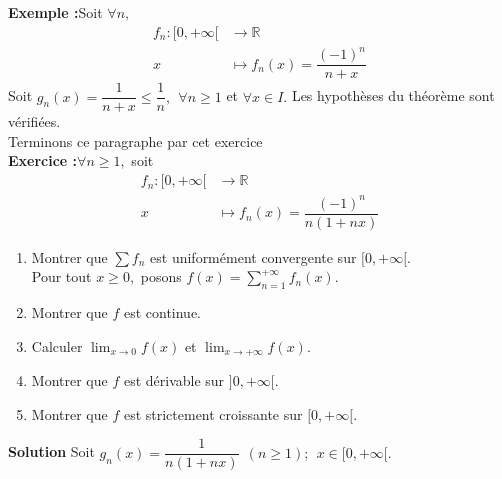 \documentclass[11pt, a4paper]{book}
\begin{document}
\textbf{Exemple :}\quad Soit $\forall n,$ 
\begin{align*}
f_n:[0,+\infty[&\longrightarrow\mathbb{R}\\
x&\longmapsto f_n(x)=\dfrac{(-1)^n}{n+x}
\end{align*}
Soit $g_n(x)=\dfrac{1}{n+x}\leq\dfrac{1}{n},~~\forall n\geq1$ et $\forall x\in I.$ Les hypoth\`eses du th\'eor\`eme sont v\'erifi\'ees.\\
Terminons ce paragraphe par cet exercice\\
\textbf{Exercice :}\quad $\forall n\geq 1,$ soit 
\begin{align*}
f_n:[0,+\infty[&\longrightarrow\mathbb{R}\\
x&\longmapsto f_n(x)=\dfrac{(-1)^n}{n(1+nx)}
\end{align*}
\begin{enumerate}
\item Montrer que $\sum f_n$ est uniform\'ement convergente sur $[0,+\infty[$.\\
Pour tout $x\geq0,$ posons ${\displaystyle f(x)=\sum_{n=1}^{+\infty}f_n(x).}$
\item Montrer que $f$ est continue.
\item Calculer ${\displaystyle \lim_{x\rightarrow0}f(x)}$ et ${\displaystyle \lim_{x\rightarrow+\infty}f(x).}$
\item Montrer que $f$ est d\'erivable sur $]0,+\infty[.$
\item Montrer que $f$ est strictement croissante sur $[0,+\infty[.$
\end{enumerate}
\textbf{Solution}\quad
Soit $g_n(x)=\dfrac{1}{n(1+nx)}~~(n\geq1);~~x\in [0,+\infty[.$
\end{document}
